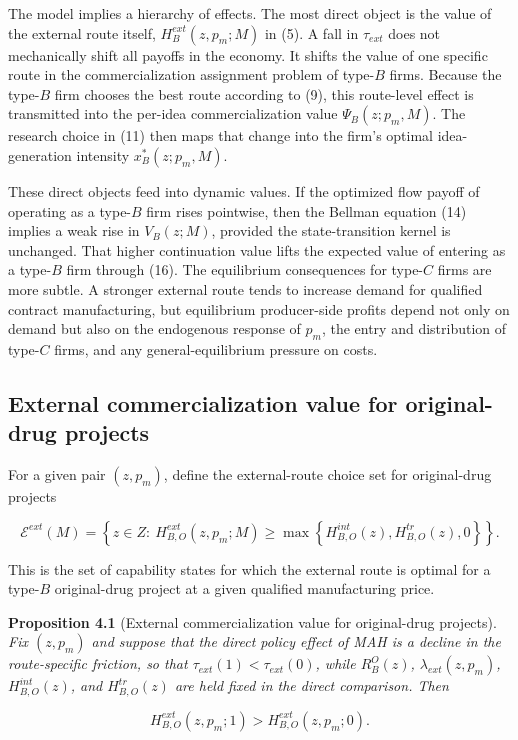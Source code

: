 \documentclass[12pt]{article}
\begin{document}
The model implies a hierarchy of effects. The most direct object is the value of the external
route itself, $H^{ext}_B(z,p_m;M)$ in (5). A fall in $\tau_{ext}$ does not mechanically shift all payoffs in
the economy. It shifts the value of one specific route in the commercialization assignment
problem of type-$B$ firms. Because the type-$B$ firm chooses the best route according to (9),
this route-level effect is transmitted into the per-idea commercialization value $\Psi_B(z;p_m,M)$.
The research choice in (11) then maps that change into the firm's optimal idea-generation
intensity $x_B^*(z;p_m,M)$.

These direct objects feed into dynamic values. If the optimized flow payoff of operating as
a type-$B$ firm rises pointwise, then the Bellman equation (14) implies a weak rise in $V_B(z;M)$,
provided the state-transition kernel is unchanged. That higher continuation value lifts the
expected value of entering as a type-$B$ firm through (16). The equilibrium consequences
for type-$C$ firms are more subtle. A stronger external route tends to increase demand for
qualified contract manufacturing, but equilibrium producer-side profits depend not only on
demand but also on the endogenous response of $p_m$, the entry and distribution of type-$C$
firms, and any general-equilibrium pressure on costs.


\subsection{External commercialization value for original-drug projects}

For a given pair $(z,p_m)$, define the external-route choice set for original-drug projects

\[
\mathcal{E}^{ext}(M)=\left\{z\in Z:\ H_{B,O}^{ext}(z,p_m;M)\ge
\max\left\{H_{B,O}^{int}(z),H_{B,O}^{tr}(z),0\right\}\right\}.
\]

This is the set of capability states for which the external route is optimal for a type-$B$
original-drug project at a given qualified manufacturing price.

\textbf{Proposition 4.1} (External commercialization value for original-drug projects). \textit{Fix $(z,p_m)$ and suppose that the direct policy effect of MAH is a decline in the route-specific friction, so that $\tau_{ext}(1)<\tau_{ext}(0)$, while $R_B^O(z)$, $\lambda_{ext}(z,p_m)$, $H_{B,O}^{int}(z)$, and $H_{B,O}^{tr}(z)$ are held fixed in the direct comparison. Then}

\[
H_{B,O}^{ext}(z,p_m;1)>H_{B,O}^{ext}(z,p_m;0).
\]
\end{document}
